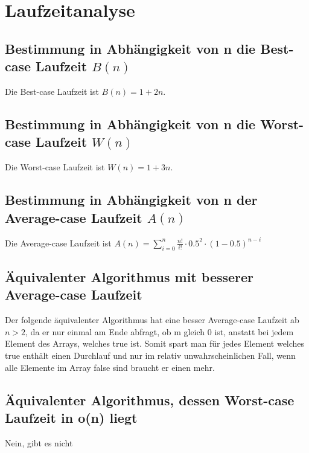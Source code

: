 \section{Laufzeitanalyse}
\subsection{Bestimmung in Abhängigkeit von n die Best-case Laufzeit $B(n)$}
Die Best-case Laufzeit ist $B(n)=1+2n$.
\subsection{Bestimmung in Abhängigkeit von n die Worst-case Laufzeit $W(n)$}
Die Worst-case Laufzeit ist $W(n)=1+3n$.
\subsection{Bestimmung in Abhängigkeit von n der Average-case Laufzeit $A(n)$}
Die Average-case Laufzeit ist $A(n)=\sum\nolimits_{i=0}^n \frac{n!}{i!} \cdot 0.5^2 \cdot (1-0.5)^{n-i}$
\subsection{Äquivalenter Algorithmus mit besserer Average-case Laufzeit}
Der folgende äquivalenter Algorithmus hat eine besser Average-case Laufzeit ab $n>2$, da er nur einmal am Ende abfragt, ob m gleich 0 ist, anstatt bei jedem Element des Arrays, welches true ist. Somit spart man für jedes Element welches true enthält einen Durchlauf und nur im relativ unwahrscheinlichen Fall, wenn alle Elemente im Array false sind braucht er einen mehr.

\subsection{Äquivalenter Algorithmus, dessen Worst-case Laufzeit in o(n) liegt}
Nein, gibt es nicht